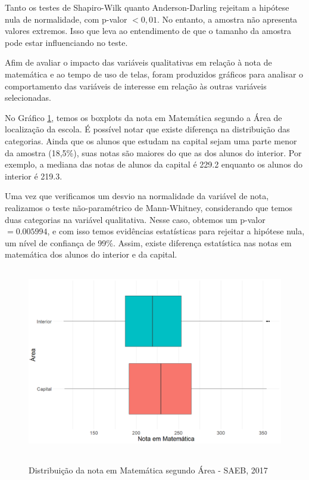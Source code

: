 \documentclass[a4paper, 12pt]{article} %
\begin{document}
Tanto os testes de Shapiro-Wilk quanto Anderson-Darling rejeitam a hipótese nula de normalidade, com p-valor $< 0,01$. No entanto, a amostra não apresenta valores extremos. Isso que leva ao entendimento de que o tamanho da amostra pode estar influenciando no teste.

Afim de avaliar o impacto das variáveis qualitativas em relação à nota de matemática e ao tempo de uso de telas, foram produzidos gráficos para analisar o comportamento das variáveis de interesse em relação às outras variáveis selecionadas. 

No Gráfico \ref{fig2}, temos os boxplots da nota em Matemática segundo a Área de localização da escola. É possível notar que existe diferença na distribuição das categorias. Ainda que os alunos que estudam na capital sejam uma parte menor da amostra (18,5\%), suas notas são maiores do que as dos alunos do interior. Por exemplo, a mediana das notas de alunos da capital é 229.2 enquanto os alunos do interior é 219.3. 

Uma vez que verificamos um desvio na normalidade da variável de nota, realizamos o teste não-paramétrico de Mann-Whitney, considerando que temos duas categorias na variável qualitativa. Nesse caso, obtemos um p-valor $=0.005994$, e com isso temos evidências estatísticas para rejeitar a hipótese nula, um nível de confiança de 99\%. Assim, existe diferença estatística nas notas em matemática dos alunos do interior e da capital.

\begin{figure}[!ht]
\vspace{-0.25cm}
\caption{Distribuição da nota em Matemática segundo Área - SAEB, 2017}
\centering
\includegraphics[height=8.2cm,width=12.7cm]{figuras/boxplot_nota_area.png}
\vspace{-0.2cm}
\label{fig2}
\\ 
\end{figure}
\end{document}
